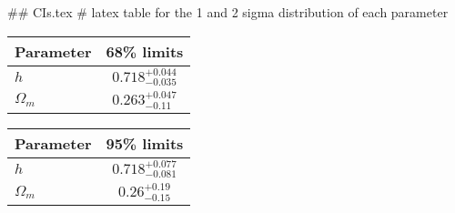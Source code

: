 ## CIs.tex
# latex table for the 1 and 2 sigma distribution of each parameter

\begin{tabular} { l  c}
 Parameter &  68\% limits\\
\hline
{\boldmath$h              $} & $0.718^{+0.044}_{-0.035}   $\\
{\boldmath$\Omega_m       $} & $0.263^{+0.047}_{-0.11}    $\\
\hline
\end{tabular}

\begin{tabular} { l  c}
 Parameter &  95\% limits\\
\hline
{\boldmath$h              $} & $0.718^{+0.077}_{-0.081}   $\\
{\boldmath$\Omega_m       $} & $0.26^{+0.19}_{-0.15}      $\\
\hline
\end{tabular}

